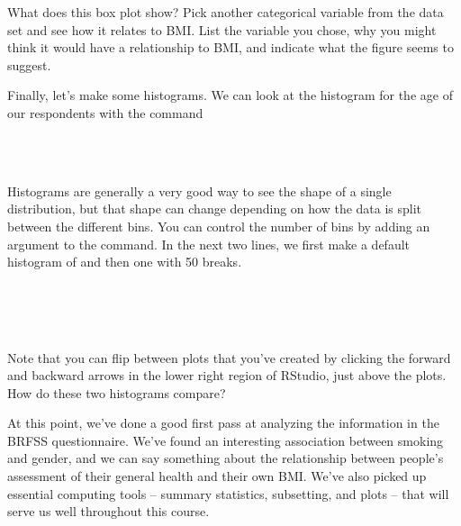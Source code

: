 \documentclass[11pt]{article}
\begin{document}
\begin{exercise}
What does this box plot show? Pick another categorical variable from the data set and see how it relates to BMI. List the variable you chose, why you might think it would have a relationship to BMI,  and indicate what the figure seems to suggest. 
\end{exercise}

Finally, let's make some histograms. We can look at the histogram for the age of our respondents with the command

\ttfamily\noindent
\hlstd{}\hspace*{\fill}\\
\hlstd{}\hlkeyword{(}\hlkeyword{\usebox{\hlnormalsizeboxdollar}}\hlkeyword{)}\hspace*{\fill}\\
\normalfont

Histograms are generally a very good way to see the shape of a single distribution, but that shape can change depending on how the data is split between the different bins.  You can control the number of bins by adding an argument to the command. In the next two lines, we first make a default histogram of \texttt{} and then one with 50 breaks.

\ttfamily\noindent
\hlstd{}\hspace*{\fill}\\
\hlstd{}\hlkeyword{(}\hlkeyword{)}\hspace*{\fill}\\
\hlstd{}\hlkeyword{(}\hlkeyword{,}{\ }\hlargument{=}{\ }\hlkeyword{)}\hspace*{\fill}\\
\normalfont

Note that you can flip between plots that you've created by clicking the forward and backward arrows in the lower right region of RStudio, just above the plots.  How do these two histograms compare?

At this point, we've done a good first pass at analyzing the information in the BRFSS questionnaire.  We've found an interesting association between smoking and gender, and we can say something about the relationship between people's assessment of their general health and their own BMI.  We've also picked up essential computing tools -- summary statistics, subsetting, and plots -- that will serve us well throughout this course.
\end{document}
